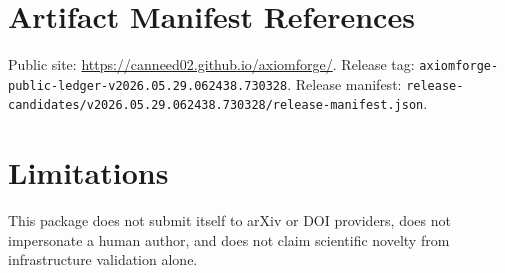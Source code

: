 \documentclass[11pt]{article}
\begin{document}
\section*{Artifact Manifest References}
Public site: \url{https://canneed02.github.io/axiomforge/}. Release tag:
\texttt{axiomforge-public-ledger-v2026.05.29.062438.730328}.
Release manifest:
\texttt{release-candidates/v2026.05.29.062438.730328/release-manifest.json}.

\section*{Limitations}
This package does not submit itself to arXiv or DOI providers, does not
impersonate a human author, and does not claim scientific novelty from
infrastructure validation alone.



\end{document}
